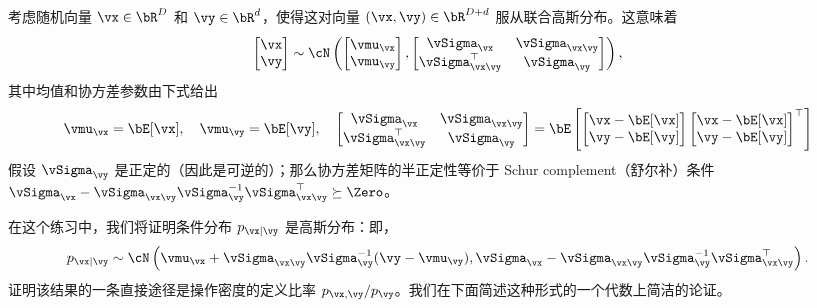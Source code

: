 \documentclass[../../book-main_zh.tex]{subfiles}
\begin{document}
\begin{exercise}\label{exercise:conditional_gaussian}
    考虑随机向量 $\vx \in \bR^D$ 和 $\vy \in \bR^d$，使得这对向量 $(\vx, \vy) \in \bR^{D + d}$ 服从联合高斯分布。这意味着
    \begin{equation*}
        \begin{bmatrix}
            \vx \\
            \vy
        \end{bmatrix}
        \sim
        \cN \left(
            \begin{bmatrix}
                \vmu_{\vx} \\
                \vmu_{\vy}
            \end{bmatrix}
            ,
            \begin{bmatrix}
                \vSigma_{\vx} & \vSigma_{\vx\vy} \\
                \vSigma_{\vx\vy}^\top & \vSigma_{\vy}
            \end{bmatrix}
        \right),
    \end{equation*}
    其中均值和协方差参数由下式给出
    \begin{equation*}
        \vmu_{\vx} = \bE[\vx],\quad \vmu_{\vy} = \bE[\vy],\quad
        \begin{bmatrix}
            \vSigma_{\vx} & \vSigma_{\vx\vy} \\
            \vSigma_{\vx\vy}^\top & \vSigma_{\vy}
        \end{bmatrix}
        =
        \bE\left[
            \begin{bmatrix}
                \vx - \bE[\vx] \\
                \vy - \bE[\vy]
            \end{bmatrix}
            \begin{bmatrix}
                \vx - \bE[\vx] \\
                \vy - \bE[\vy]
            \end{bmatrix}^\top
        \right]
    \end{equation*}
    假设 $\vSigma_{\vy}$ 是正定的（因此是可逆的）；那么协方差矩阵的半正定性等价于 Schur complement（舒尔补）条件 $\vSigma_{\vx} - \vSigma_{\vx\vy} \vSigma_{\vy}^{-1} \vSigma_{\vx\vy}^\top \succeq \Zero$。

    在这个练习中，我们将证明条件分布 $p_{\vx \mid \vy}$ 是高斯分布：即，
    \begin{equation}\label{eq:gaussian-conditional-eqn}
        p_{\vx \mid \vy} \sim \cN\left(
            \vmu_{\vx} + \vSigma_{\vx\vy} \vSigma_{\vy}^{-1} (\vy
            - \vmu_{\vy}),
            \vSigma_{\vx} - \vSigma_{\vx\vy} \vSigma_{\vy}^{-1}
            \vSigma_{\vx\vy}^{\top}
        \right).
    \end{equation}
    证明该结果的一条直接途径是操作密度的定义比率 $p_{\vx, \vy} / p_{\vy}$。我们在下面简述这种形式的一个代数上简洁的论证。


\end{exercise}
\end{document}
